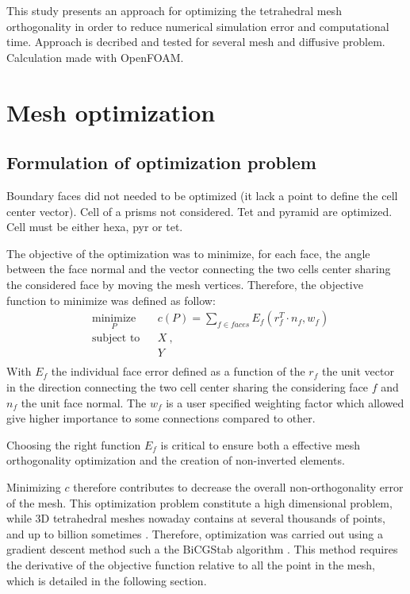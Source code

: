 \documentclass[11pt]{article}
\begin{document}
This study presents an approach for optimizing the tetrahedral mesh orthogonality in order to reduce numerical simulation error and computational time.
Approach is decribed and tested for several mesh and diffusive problem.
Calculation made with OpenFOAM.



\section{Mesh optimization}


\subsection{Formulation of optimization problem}

Boundary faces did not needed to be optimized (it lack a point to define the cell center vector).
Cell of a prisms not considered. Tet and pyramid are optimized. Cell must be either hexa, pyr or tet.

The objective of the optimization was to minimize, for each face, the angle between the face normal and the vector connecting the two cells center sharing the considered face by moving the mesh vertices. 
Therefore, the objective function to minimize was defined as follow:
%
\begin{equation}
\begin{aligned}
& \underset{P}{\text{minimize}}
& & c(P) = \sum_{f \in faces} E_f \left( r_f^T \cdot n_f, w_f \right)  \\
& \text{subject to}
& & 
X \: , \\
& & & Y \\
\end{aligned}
\label{eq:opt_problem}
\end{equation}
With $E_f$ the individual face error defined as a function of the $r_f$ the unit vector in the direction connecting the two cell center sharing the considering face $f$ and $n_f$ the unit face normal. 
The $w_f$ is a user specified weighting factor which allowed give higher importance to some connections compared to other.

Choosing the right function $E_f$ is critical to ensure both a effective mesh orthogonality optimization and the creation of non-inverted elements. 

Minimizing $c$ therefore contributes to decrease the overall non-orthogonality error of the mesh.
This optimization problem constitute a high dimensional problem, while 3D tetrahedral meshes nowaday contains at several thousands of points, and up to billion sometimes \cite{neau_massively_2020}.
Therefore, optimization was carried out using a gradient descent method such a the BiCGStab algorithm \cite{}.
This method requires the derivative of the objective function relative to all the point in the mesh, which is detailed in the following section.
\end{document}
